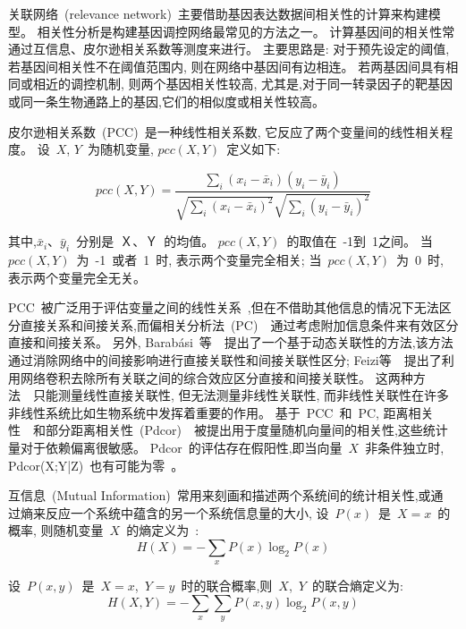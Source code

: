 关联网络~(relevance network)~主要借助基因表达数据间相关性的计算来构建模型。
相关性分析是构建基因调控网络最常见的方法之一。
计算基因间的相关性常通过互信息、皮尔逊相关系数等测度来进行。
主要思路是: 对于预先设定的阈值, 若基因间相关性不在阈值范围内, 则在网络中基因间有边相连。
若两基因间具有相同或相近的调控机制, 则两个基因相关性较高,
尤其是,对于同一转录因子的靶基因或同一条生物通路上的基因,它们的相似度或相关性较高。

皮尔逊相关系数~(PCC)~是一种线性相关系数, 它反应了两个变量间的线性相关程度。
设~$X$, $Y$~为随机变量, $pcc(X,Y)$~定义如下:

\begin{equation}
pcc(X,Y) = \frac{{\sum\limits_i {(x_i -\bar x_i )(y_i -\bar y_i )} }}{{\sqrt {\sum\limits_i {(x_i  - \bar x_i )^2 } } \sqrt {\sum\limits_i {(y_i  - \bar y_i )^2 } } }}
\end{equation}

其中,$\bar x_i$、$\bar y_i$~分别是~Ｘ、Ｙ~的均值。
$pcc(X,Y)$~的取值在~-1到~1之间。
当~$pcc(X,Y)$~为~-1~或者~1~时, 表示两个变量完全相关;
当~$pcc(X,Y)$~为~0~时, 表示两个变量完全无关。

PCC~被广泛用于评估变量之间的线性关系~\cite{stuart2003gene},但在不借助其他信息的情况下无法区分直接关系和间接关系,而偏相关分析法~(PC)~\cite{baba2004partial}~通过考虑附加信息条件来有效区分直接和间接关系。
另外, Barabási~等~\cite{barzel2013network}~提出了一个基于动态关联性的方法,该方法通过消除网络中的间接影响进行直接关联性和间接关联性区分; 
Feizi等~\cite{feizi2013network}~提出了利用网络卷积去除所有关联之间的综合效应区分直接和间接关联性。
这两种方法~\cite{barzel2013network,feizi2013network}~只能测量线性直接关联性,
但无法测量非线性关联性, 而非线性关联性在许多非线性系统比如生物系统中发挥着重要的作用。
基于~PCC~和~PC, 距离相关性~\cite{szekely2007measuring,kosorok2009brownian}~和部分距离相关性~(Pdcor)~\cite{szekely2014partial}~被提出用于度量随机向量间的相关性,这些统计量对于依赖偏离很敏感。
Pdcor~的评估存在假阳性,即当向量~$X$~非条件独立时, Pdcor(X;Y|Z)~也有可能为零~\cite{szekely2014partial}。

互信息~(Mutual Information)~常用来刻画和描述两个系统间的统计相关性,或通
过熵来反应一个系统中蕴含的另一个系统信息量的大小, 设~$P(x)$~是~$X=x$~的概率,
则随机变量~$X$~的熵定义为~\cite{cover2012elements}:
\begin{equation}
H(X) = - \sum\limits_x {P(x)\log _2 P(x)} 
\end{equation}

设~$P(x,y)$~是~$X=x$,~$Y=y$~时的联合概率,则~$X$,~$Y$~的联合熵定义为:
\begin{equation}
H(X,Y) =  - \sum\limits_x {\sum\limits_y {P(x,y)\log _2 P(x,y)} } 
\end{equation}

